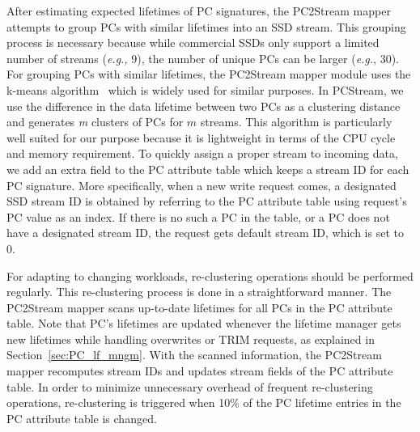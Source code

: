 After estimating expected lifetimes of PC signatures, the PC2Stream mapper
attempts to group PCs with similar lifetimes into an SSD stream.  This grouping
process is necessary because while commercial SSDs only support a limited
number of streams ({\it e.g.,} 9), the number of unique PCs can be larger ({\it e.g.},
30).  For grouping PCs with similar lifetimes, the PC2Stream mapper module
uses the k-means algorithm~\cite{kmeans} which is widely used for similar
purposes.  In \textsf{\small PCStream}, we use the difference in the data
lifetime between two PCs as a clustering distance and  generates {\it m}
clusters of PCs for $m$ streams.  This algorithm is particularly well suited
for our purpose because it is lightweight in terms of the CPU cycle and
memory requirement.  To quickly assign a proper stream to incoming data, we add
an extra field to the PC attribute table which keeps a stream ID for each PC
signature.  More specifically, when a new write request comes, a designated SSD
stream ID is obtained by referring to the PC attribute table using request's PC
value as an index.  If there is no such a PC in the table, or a PC does not
have a designated stream ID, the request gets default stream ID, which is set
to 0.

For adapting to changing workloads, re-clustering operations should be
performed regularly. This re-clustering process is done in a straightforward
manner. The PC2Stream mapper scans up-to-date lifetimes for all PCs in the PC
attribute table. Note that PC's lifetimes are updated whenever the lifetime
manager gets new lifetimes while handling overwrites or TRIM requests, as
explained in Section~\ref{sec:PC_lf_mngm}.  With the scanned information, the PC2Stream mapper
recomputes stream IDs and updates stream fields of the PC attribute table.  In
order to minimize unnecessary overhead of frequent re-clustering operations,
re-clustering is triggered when 10\% of the PC lifetime entries in the PC
attribute table is changed.


